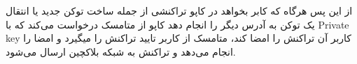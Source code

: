 از این پس هرگاه که کابر بخواهد در کاپو تراکنشی از جمله ساخت توکن جدید یا انتقال یک توکن به آدرس دیگر را انجام دهد کاپو از متامسک درخواست می‌کند که با
\gls{Private key}
کاربر آن تراکنش را امضا کند، متامسک از کاربر تایید تراکنش را میگیرد و امضا را انجام می‌دهد و تراکنش به شبکه بلاکچین ارسال می‌شود.


